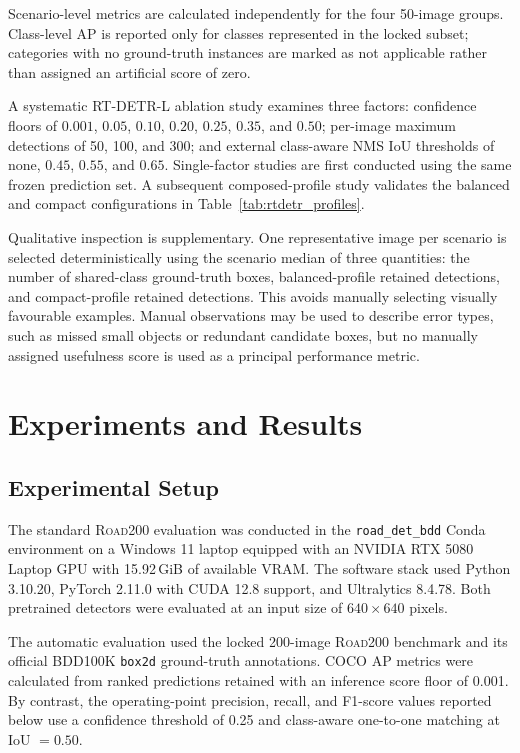 \documentclass[runningheads]{llncs}
\begin{document}
Scenario-level metrics are calculated independently for the four 50-image groups. Class-level AP is reported only for classes represented in the locked subset; categories with no ground-truth instances are marked as not applicable rather than assigned an artificial score of zero.

A systematic RT-DETR-L ablation study examines three factors: confidence floors of $0.001$, $0.05$, $0.10$, $0.20$, $0.25$, $0.35$, and $0.50$; per-image maximum detections of 50, 100, and 300; and external class-aware NMS IoU thresholds of none, $0.45$, $0.55$, and $0.65$. Single-factor studies are first conducted using the same frozen prediction set. A subsequent composed-profile study validates the balanced and compact configurations in Table~\ref{tab:rtdetr_profiles}.

Qualitative inspection is supplementary. One representative image per scenario is selected deterministically using the scenario median of three quantities: the number of shared-class ground-truth boxes, balanced-profile retained detections, and compact-profile retained detections. This avoids manually selecting visually favourable examples. Manual observations may be used to describe error types, such as missed small objects or redundant candidate boxes, but no manually assigned usefulness score is used as a principal performance metric.

\FloatBarrier

\section{Experiments and Results}

\subsection{Experimental Setup}

The standard \textsc{Road200} evaluation was conducted in the
\texttt{road\_det\_bdd} Conda environment on a Windows 11 laptop
equipped with an NVIDIA RTX 5080 Laptop GPU with 15.92\,GiB of
available VRAM. The software stack used Python 3.10.20, PyTorch 2.11.0 with CUDA 12.8 support, and Ultralytics 8.4.78. Both pretrained detectors were evaluated at an input size of $640 \times 640$ pixels.

The automatic evaluation used the locked 200-image \textsc{Road200} benchmark and its official BDD100K \texttt{box2d} ground-truth annotations. COCO AP metrics were calculated from ranked predictions retained with an inference score floor of 0.001. By contrast, the operating-point precision, recall, and F1-score values reported below use a confidence threshold of 0.25 and class-aware one-to-one matching at IoU $=0.50$.
\end{document}

